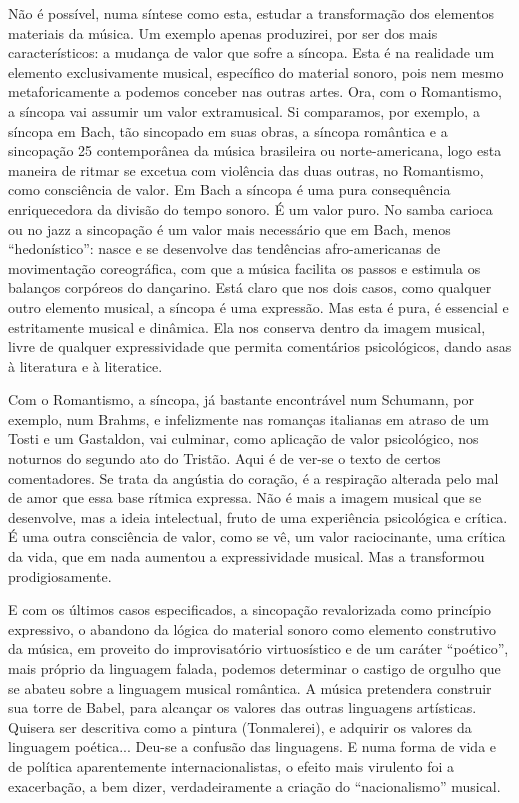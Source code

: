 Não é possível, numa síntese como esta, estudar a transformação dos
elementos materiais da música. Um exemplo apenas produzirei, por ser dos
mais característicos: a mudança de valor que sofre a síncopa. Esta é na
realidade um elemento exclusivamente musical, específico do material
sonoro, pois nem mesmo metaforicamente a podemos conceber nas outras
artes. Ora, com o Romantismo, a síncopa vai assumir um valor
extramusical. Si comparamos, por exemplo, a síncopa em Bach, tão
sincopado em suas obras, a síncopa romântica e a sincopação 25
contemporânea da música brasileira ou norte-americana, logo esta maneira
de ritmar se excetua com violência das duas outras, no Romantismo, como
consciência de valor. Em Bach a síncopa é uma pura consequência
enriquecedora da divisão do tempo sonoro. É um valor puro. No samba
carioca ou no jazz a sincopação é um valor mais necessário que em Bach,
menos ``hedonístico'': nasce e se desenvolve das tendências
afro-americanas de movimentação coreográfica, com que a música facilita
os passos e estimula os balanços corpóreos do dançarino. Está claro que
nos dois casos, como qualquer outro elemento musical, a síncopa é uma
expressão. Mas esta é pura, é essencial e estritamente musical e
dinâmica. Ela nos conserva dentro da imagem musical, livre de qualquer
expressividade que permita comentários psicológicos, dando asas à
literatura e à literatice.

Com o Romantismo, a síncopa, já bastante encontrável num Schumann, por
exemplo, num Brahms, e infelizmente nas romanças italianas em atraso de
um Tosti e um Gastaldon, vai culminar, como aplicação de valor
psicológico, nos noturnos do segundo ato do Tristão. Aqui é de ver-se o
texto de certos comentadores. Se trata da angústia do coração, é a
respiração alterada pelo mal de amor que essa base rítmica expressa. Não
é mais a imagem musical que se desenvolve, mas a ideia intelectual,
fruto de uma experiência psicológica e crítica. É uma outra consciência
de valor, como se vê, um valor raciocinante, uma crítica da vida, que em
nada aumentou a expressividade musical. Mas a transformou
prodigiosamente.

E com os últimos casos especificados, a sincopação revalorizada como
princípio expressivo, o abandono da lógica do material sonoro como
elemento construtivo da música, em proveito do improvisatório
virtuosístico e de um caráter ``poético'', mais próprio da linguagem
falada, podemos determinar o castigo de orgulho que se abateu sobre a
linguagem musical romântica. A música pretendera construir sua torre de
Babel, para alcançar os valores das outras linguagens artísticas.
Quisera ser descritiva como a pintura (Tonmalerei), e adquirir os
valores da linguagem poética... Deu-se a confusão das linguagens. E numa
forma de vida e de política aparentemente internacionalistas, o efeito
mais virulento foi a exacerbação, a bem dizer, verdadeiramente a criação
do ``nacionalismo'' musical.


